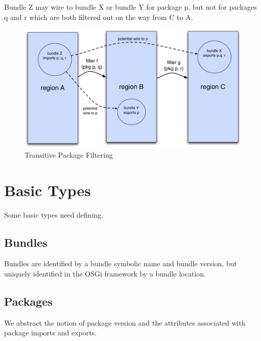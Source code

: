 \documentclass[a4paper,9pt]{article}
\begin{document}
Bundle Z may wire to bundle X or bundle Y for package p, but not for packages q and r which are both
filtered out on the way from C to A.
\begin{figure}[h!]
\begin{center}
\includegraphics*[scale=0.4]{transitive-package-filtering.pdf}
\caption{Transitive Package Filtering}
\end{center}
\label{fig:tpfilt}
\end{figure}

\clearpage
\section{Basic Types}
\label{cha:basics}

Some basic types need defining.

\subsection*{Bundles}

Bundles are identified by a bundle symbolic name and bundle version, but uniquely identified in the
OSGi framework by a bundle location.
\begin{zed}
\end{zed}

\subsection*{Packages}

We abstract the notion of package version and the attributes associated with package imports and exports.
\begin{zed}
  [Package]
\end{zed}
\end{document}
